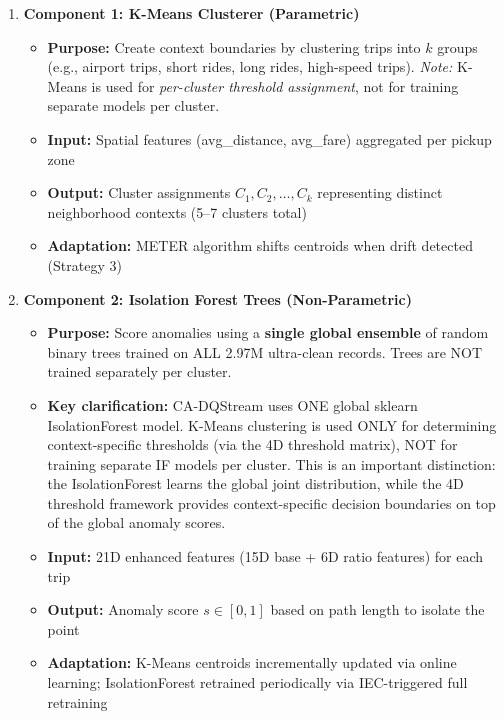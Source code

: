 \begin{enumerate}
    \item \textbf{Component 1: K-Means Clusterer (Parametric)}
        \begin{itemize}
            \item \textbf{Purpose:} Create context boundaries by clustering trips into $k$ groups (e.g., airport trips, short rides, long rides, high-speed trips). \textit{Note:} K-Means is used for \emph{per-cluster threshold assignment}, not for training separate models per cluster.
            \item \textbf{Input:} Spatial features (avg\_distance, avg\_fare) aggregated per pickup zone
            \item \textbf{Output:} Cluster assignments $C_1, C_2, \ldots, C_k$ representing distinct neighborhood contexts (5--7 clusters total)
            \item \textbf{Adaptation:} METER algorithm shifts centroids when drift detected (Strategy 3)
        \end{itemize}

    \item \textbf{Component 2: Isolation Forest Trees (Non-Parametric)}
        \begin{itemize}
            \item \textbf{Purpose:} Score anomalies using a \textbf{single global ensemble} of random binary trees trained on ALL 2.97M ultra-clean records. Trees are NOT trained separately per cluster.
            \item \textbf{Key clarification:} CA-DQStream uses ONE global sklearn IsolationForest model. K-Means clustering is used ONLY for determining context-specific thresholds (via the 4D threshold matrix), NOT for training separate IF models per cluster. This is an important distinction: the IsolationForest learns the global joint distribution, while the 4D threshold framework provides context-specific decision boundaries on top of the global anomaly scores.
            \item \textbf{Input:} 21D enhanced features (15D base + 6D ratio features) for each trip
            \item \textbf{Output:} Anomaly score $s \in [0, 1]$ based on path length to isolate the point
            \item \textbf{Adaptation:} K-Means centroids incrementally updated via online learning; IsolationForest retrained periodically via IEC-triggered full retraining
        \end{itemize}
\end{enumerate}

